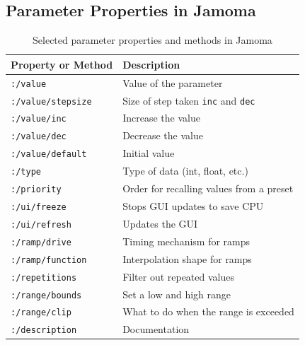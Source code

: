 \documentclass{article}
\begin{document}

\subsection{Parameter Properties in Jamoma} %

\begin{table}
\begin{center}
\footnotesize\noindent
\begin{tabular}{| l | p{4.5cm} |}
    \hline
    \textbf{Property or Method}          & \textbf{Description}\\ 
	\hline
	\texttt{:/value}			& Value of the parameter \\
	\hline
	\texttt{:/value/stepsize}	& Size of step taken \texttt{inc} and \texttt{dec} \\
	\hline
	\texttt{:/value/inc}		& Increase the value \\
	\hline
	\texttt{:/value/dec}		& Decrease the value \\
	\hline
	\texttt{:/value/default}	& Initial value \\
	\hline
	\texttt{:/type} 			& Type of data (int, float, etc.) \\
	\hline
	\texttt{:/priority} 		& Order for recalling values from a preset \\
	\hline
	\texttt{:/ui/freeze} 		& Stops GUI updates to save CPU \\
	\hline
	\texttt{:/ui/refresh} 		& Updates the GUI \\
	\hline
	\texttt{:/ramp/drive} 		& Timing mechanism for ramps \\
	\hline
	\texttt{:/ramp/function} 	& Interpolation shape for ramps \\
	\hline
	\texttt{:/repetitions} 		& Filter out repeated values \\
	\hline
	\texttt{:/range/bounds} 	& Set a low and high range \\
	\hline
	\texttt{:/range/clip} 		& What to do when the range is exceeded \\
	\hline
	\texttt{:/description} 		& Documentation \\
	\hline
\end{tabular}
\end{center}
\caption{Selected parameter properties and methods in Jamoma}
\label{tab:parameter_properties}
\end{table}
\end{document}
